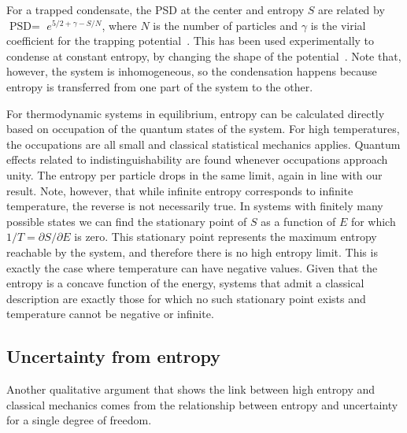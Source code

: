 \documentclass{SciPost}
\begin{document}
For a trapped condensate, the PSD at the center and entropy $S$ are related by $\text{PSD}=$ $e^{5/2+\gamma-S/N}$, where $N$ is the number of particles and $\gamma$ is the virial coefficient for the trapping potential~\cite{PhysRevLett.78.990}. This has been used experimentally to condense at constant entropy, by changing the shape of the potential~\cite{PhysRevLett.81.2194}. Note that, however, the system is inhomogeneous, so the condensation happens because entropy is transferred from one part of the system to the other.

For thermodynamic systems in equilibrium, entropy can be calculated directly based on occupation of the quantum states of the system. For high temperatures, the occupations are all small and classical statistical mechanics applies. Quantum effects related to indistinguishability are found whenever occupations approach unity. The entropy per particle drops in the same limit, again in line with our result. Note, however, that while infinite entropy corresponds to infinite temperature, the reverse is not necessarily true. In systems with finitely many possible states we can find the stationary point of $S$ as a function of $E$ for which $1/T=\partial S/\partial E$ is zero. This stationary point represents the maximum entropy reachable by the system, and therefore there is no high entropy limit. This is exactly the case where temperature can have negative values. Given that the entropy is a concave function of the energy, systems that admit a classical description are exactly those for which no such stationary point exists and temperature cannot be negative or infinite.%

\subsection{Uncertainty from entropy}

Another qualitative argument that shows the link between high entropy and classical mechanics comes from the relationship between entropy and uncertainty for a single degree of freedom.
\end{document}
